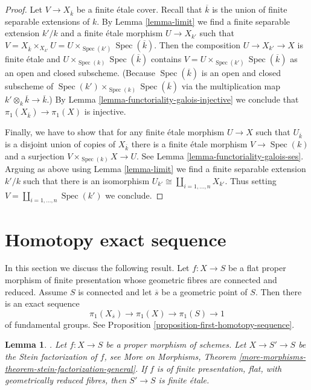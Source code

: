 \documentclass{stacks-project}
\newenvironment{reference}{\comment}{\endcomment}
\theoremstyle{plain}
\newtheorem{lemma}[subsection]{Lemma}
\theoremstyle{definition}
\theoremstyle{remark}
\numberwithin{equation}{subsection}
\def\Spec{\mathop{\mathrm{Spec}}}
\begin{document}
\begin{proof}
\medskip\noindent
Let $V \to X_{\overline{k}}$ be a finite \'etale cover. Recall that
$\overline{k}$ is the union of finite separable extensions of $k$.
By Lemma \ref{lemma-limit} we find a finite separable extension $k'/k$
and a finite \'etale morphism $U \to X_{k'}$ such that
$V = X_{\overline{k}} \times_{X_{k'}} U =
U \times_{\Spec(k')} \Spec(\overline{k})$.
Then the composition $U \to X_{k'} \to X$ is finite \'etale
and $U \times_{\Spec(k)} \Spec(\overline{k})$
contains $V = U \times_{\Spec(k')} \Spec(\overline{k})$
as an open and closed subscheme. (Because $\Spec(\overline{k})$
is an open and closed subscheme of
$\Spec(k') \times_{\Spec(k)} \Spec(\overline{k})$ via
the multiplication map $k' \otimes_k \overline{k} \to \overline{k}$.) By
Lemma \ref{lemma-functoriality-galois-injective}
we conclude that $\pi_1(X_{\overline{k}}) \to \pi_1(X)$ is injective.

\medskip\noindent
Finally, we have to show that for any finite \'etale morphism
$U \to X$ such that $U_{\overline{k}}$ is a disjoint union
of copies of $X_{\overline{k}}$ there is a finite \'etale
morphism $V \to \Spec(k)$ and a surjection $V \times_{\Spec(k)} X \to U$.
See Lemma \ref{lemma-functoriality-galois-ses}.
Arguing as above using Lemma \ref{lemma-limit}
we find a finite separable extension $k'/k$
such that there is an isomorphism
$U_{k'} \cong \coprod_{i = 1, \ldots, n} X_{k'}$.
Thus setting $V = \coprod_{i = 1, \ldots, n} \Spec(k')$
we conclude.
\end{proof}






\section{Homotopy exact sequence}
\label{section-homotopy-exact-sequence}

\noindent
In this section we discuss the following result.
Let $f : X \to S$ be a flat proper morphism of
finite presentation whose
geometric fibres are connected and reduced.
Assume $S$ is connected and let $\overline{s}$
be a geometric point of $S$. Then there is an exact
sequence
$$
\pi_1(X_{\overline{s}}) \to \pi_1(X) \to \pi_1(S) \to 1
$$
of fundamental groups. See
Proposition \ref{proposition-first-homotopy-sequence}.

\begin{lemma}
\label{lemma-stein-factorization-etale}
\begin{reference}
\cite[Expose X, Proposition 1.2, p. 262]{SGA1}.
\end{reference}
Let $f : X \to S$ be a proper morphism of schemes.
Let $X \to S' \to S$ be the Stein factorization of $f$, see
More on Morphisms, Theorem
\ref{more-morphisms-theorem-stein-factorization-general}.
If $f$ is of finite presentation, flat, with geometrically
reduced fibres, then $S' \to S$ is finite \'etale.
\end{lemma}
\end{document}
